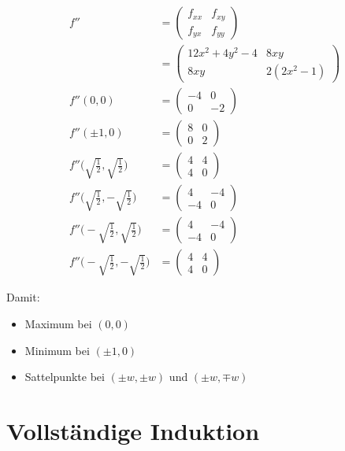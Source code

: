 \documentclass[english,ngerman,fontsize=9pt,intoc,index=totoc,refpage,listof=totoc,draft]{scrbook}
\numberwithin{equation}{section}
\begin{document}
\begin{align*}
f'' & = \begin{pmatrix}
	f_{xx} & f_{xy} \\
	f_{yx} & f_{yy}
\end{pmatrix}\\
 & =\begin{pmatrix}
 	12x^2+4y^2-4 & 8xy       \\
 	8xy          & 2(2x^2-1)
 \end{pmatrix}\\
f''(0,0) & = \begin{pmatrix}
	-4 & 0  \\
	0  & -2
\end{pmatrix}\\
f''(\pm1,0) & =\begin{pmatrix}
	8 & 0 \\
	0 & 2
\end{pmatrix}\\
f''\biggl(\sqrt{\frac{1}{2}},\sqrt{\frac{1}{2}}\biggr) & =\begin{pmatrix}
	4 & 4 \\
	4 & 0
\end{pmatrix}\\
f''\biggl(\sqrt{\frac{1}{2}},-\sqrt{\frac{1}{2}}\biggr) & =\begin{pmatrix}
	4 & -4 \\
	-4 & 0
\end{pmatrix}\\
f''\biggl(-\sqrt{\frac{1}{2}},\sqrt{\frac{1}{2}}\biggr) & =\begin{pmatrix}
	4 & -4 \\
	-4 & 0
\end{pmatrix}\\
f''\biggl(-\sqrt{\frac{1}{2}},-\sqrt{\frac{1}{2}}\biggr) & =\begin{pmatrix}
	4 & 4 \\
	4 & 0
\end{pmatrix}
\end{align*}


Damit:
\begin{itemize}
  \item Maximum bei $(0,0)$
  \item Minimum bei $(\pm1,0)$
  \item Sattelpunkte bei $(\pm w,\pm w)$ und $(\pm w,\mp w)$
\end{itemize}


\section{\label{sec:bsp-Vollständige-Induktion}Vollständige Induktion}
\end{document}
